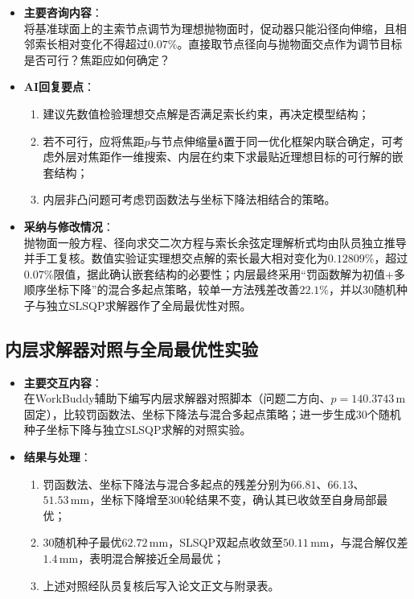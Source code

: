\documentclass[12pt,a4paper]{article}
\begin{document}
\begin{itemize}
    \item \textbf{主要咨询内容}：\\
    将基准球面上的主索节点调节为理想抛物面时，促动器只能沿径向伸缩，且相邻索长相对变化不得超过$0.07\%$。直接取节点径向与抛物面交点作为调节目标是否可行？焦距应如何确定？

    \item \textbf{AI回复要点}：
    \begin{enumerate}
        \item 建议先数值检验理想交点解是否满足索长约束，再决定模型结构；
        \item 若不可行，应将焦距$p$与节点伸缩量$\boldsymbol{\delta}$置于同一优化框架内联合确定，可考虑外层对焦距作一维搜索、内层在约束下求最贴近理想目标的可行解的嵌套结构；
        \item 内层非凸问题可考虑罚函数法与坐标下降法相结合的策略。
    \end{enumerate}

    \item \textbf{采纳与修改情况}：\\
    抛物面一般方程、径向求交二次方程与索长余弦定理解析式均由队员独立推导并手工复核。数值实验证实理想交点解的索长最大相对变化为$0.12809\%$，超过$0.07\%$限值，据此确认嵌套结构的必要性；内层最终采用``罚函数解为初值$+$多顺序坐标下降''的混合多起点策略，较单一方法残差改善$22.1\%$，并以$30$随机种子与独立SLSQP求解器作了全局最优性对照。
\end{itemize}

\subsection{内层求解器对照与全局最优性实验}

\begin{itemize}
    \item \textbf{主要交互内容}：\\
    在WorkBuddy辅助下编写内层求解器对照脚本（问题二方向、$p=140.3743\,\mathrm{m}$固定），比较罚函数法、坐标下降法与混合多起点策略；进一步生成$30$个随机种子坐标下降与独立SLSQP求解的对照实验。

    \item \textbf{结果与处理}：
    \begin{enumerate}
        \item 罚函数法、坐标下降法与混合多起点的残差分别为$66.81$、$66.13$、$51.53\,\mathrm{mm}$，坐标下降增至$300$轮结果不变，确认其已收敛至自身局部最优；
        \item $30$随机种子最优$62.72\,\mathrm{mm}$，SLSQP双起点收敛至$50.11\,\mathrm{mm}$，与混合解仅差$1.4\,\mathrm{mm}$，表明混合解接近全局最优；
        \item 上述对照经队员复核后写入论文正文与附录表。
    \end{enumerate}
\end{itemize}
\end{document}
